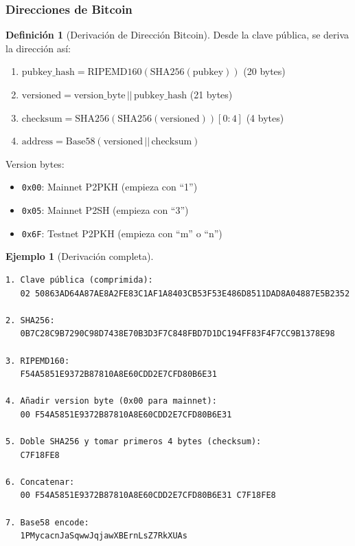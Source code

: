 \documentclass[11pt,a4paper,twoside,openright]{book}
\theoremstyle{definition}
\newtheorem{definition}{Definición}[chapter]
\newtheorem{example}{Ejemplo}[chapter]
\theoremstyle{plain}
\theoremstyle{remark}
\begin{document}
\subsubsection{Direcciones de Bitcoin}

\begin{definition}[Derivación de Dirección Bitcoin]
Desde la clave pública, se deriva la dirección así:

\begin{enumerate}
    \item $\text{pubkey\_hash} = \text{RIPEMD160}(\text{SHA256}(\text{pubkey}))$ (20 bytes)
    \item $\text{versioned} = \text{version\_byte} \,||\, \text{pubkey\_hash}$ (21 bytes)
    \item $\text{checksum} = \text{SHA256}(\text{SHA256}(\text{versioned}))[0:4]$ (4 bytes)
    \item $\text{address} = \text{Base58}(\text{versioned} \,||\, \text{checksum})$
\end{enumerate}

Version bytes:
\begin{itemize}
    \item \texttt{0x00}: Mainnet P2PKH (empieza con ``1'')
    \item \texttt{0x05}: Mainnet P2SH (empieza con ``3'')
    \item \texttt{0x6F}: Testnet P2PKH (empieza con ``m'' o ``n'')
\end{itemize}
\end{definition}

\begin{example}[Derivación completa]
\begin{verbatim}
1. Clave pública (comprimida):
   02 50863AD64A87AE8A2FE83C1AF1A8403CB53F53E486D8511DAD8A04887E5B2352

2. SHA256:
   0B7C28C9B7290C98D7438E70B3D3F7C848FBD7D1DC194FF83F4F7CC9B1378E98

3. RIPEMD160:
   F54A5851E9372B87810A8E60CDD2E7CFD80B6E31

4. Añadir version byte (0x00 para mainnet):
   00 F54A5851E9372B87810A8E60CDD2E7CFD80B6E31

5. Doble SHA256 y tomar primeros 4 bytes (checksum):
   C7F18FE8

6. Concatenar:
   00 F54A5851E9372B87810A8E60CDD2E7CFD80B6E31 C7F18FE8

7. Base58 encode:
   1PMycacnJaSqwwJqjawXBErnLsZ7RkXUAs
\end{verbatim}
\end{example}
\end{document}
